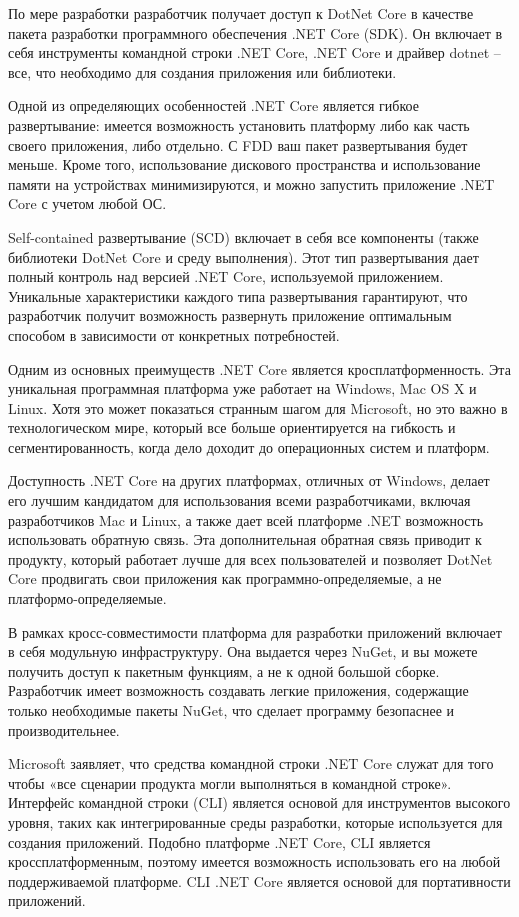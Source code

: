 По мере разработки разработчик получает доступ к DotNet Core в качестве пакета разработки программного обеспечения .NET Core (SDK). Он включает в себя инструменты командной строки .NET Core, .NET Core и драйвер dotnet – все, что необходимо для создания приложения или библиотеки.

Одной из определяющих особенностей .NET Core является гибкое развертывание: имеется возможность установить платформу либо как часть своего приложения, либо отдельно. С FDD ваш пакет развертывания будет меньше. Кроме того, использование дискового пространства и использование памяти на устройствах минимизируются, и можно запустить приложение .NET Core с учетом любой ОС.

Self-contained развертывание (SCD) включает в себя все компоненты (также библиотеки DotNet Core и среду выполнения). Этот тип развертывания дает полный контроль над версией .NET Core, используемой приложением. Уникальные характеристики каждого типа развертывания гарантируют, что разработчик получит возможность развернуть приложение оптимальным способом в зависимости от конкретных потребностей.

Одним из основных преимуществ .NET Core является кросплатформенность. Эта уникальная программная платформа уже работает на Windows, Mac OS X и Linux. Хотя это может показаться странным шагом для Microsoft, но это важно в технологическом мире, который все больше ориентируется на гибкость и сегментированность, когда дело доходит до операционных систем и платформ.

Доступность .NET Core на других платформах, отличных от Windows, делает его лучшим кандидатом для использования всеми разработчиками, включая разработчиков Mac и Linux, а также дает всей платформе .NET возможность использовать обратную связь. Эта дополнительная обратная связь приводит к продукту, который работает лучше для всех пользователей и позволяет DotNet Core продвигать свои приложения как программно-определяемые, а не платформо-определяемые.

В рамках кросс-совместимости платформа для разработки приложений включает в себя модульную инфраструктуру. Она выдается через NuGet, и вы можете получить доступ к пакетным функциям, а не к одной большой сборке. Разработчик имеет возможность создавать легкие приложения, содержащие только необходимые пакеты NuGet, что сделает программу безопаснее и производительнее.

Microsoft заявляет, что средства командной строки .NET Core служат для того чтобы «все сценарии продукта могли выполняться в командной строке». Интерфейс командной строки (CLI) является основой для инструментов высокого уровня, таких как интегрированные среды разработки, которые используется для создания приложений. Подобно платформе .NET Core, CLI является кроссплатформенным, поэтому имеется возможность использовать его на любой поддерживаемой платформе. CLI .NET Core является основой для портативности приложений.

